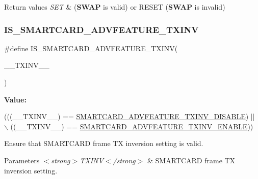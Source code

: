 \begin{DoxyRetVals}{Return values}
{\em S\+ET} & ({\bfseries S\+W\+AP} is valid) or R\+E\+S\+ET ({\bfseries S\+W\+AP} is invalid) \\
\hline
\end{DoxyRetVals}
\mbox{\label{group___s_m_a_r_t_c_a_r_d___private___macros_ga262b4258b744dad01c2452c9f785541a}} 
\subsubsection{\texorpdfstring{I\+S\+\_\+\+S\+M\+A\+R\+T\+C\+A\+R\+D\+\_\+\+A\+D\+V\+F\+E\+A\+T\+U\+R\+E\+\_\+\+T\+X\+I\+NV}{IS\_SMARTCARD\_ADVFEATURE\_TXINV}}
{\footnotesize\ttfamily \#define I\+S\+\_\+\+S\+M\+A\+R\+T\+C\+A\+R\+D\+\_\+\+A\+D\+V\+F\+E\+A\+T\+U\+R\+E\+\_\+\+T\+X\+I\+NV(\begin{DoxyParamCaption}\item[{}]{\+\_\+\+\_\+\+T\+X\+I\+N\+V\+\_\+\+\_\+ }\end{DoxyParamCaption})}

{\bfseries Value\+:}
\begin{DoxyCode}
(((\_\_TXINV\_\_) == \hyperlink{group___s_m_a_r_t_c_a_r_d___tx___inv_gacc817f4b1075b222ffff055a662171ae}{SMARTCARD\_ADVFEATURE\_TXINV\_DISABLE}) || \(\backslash\)
                                                  ((\_\_TXINV\_\_) == 
      \hyperlink{group___s_m_a_r_t_c_a_r_d___tx___inv_ga92a4fb54bdad4c0eb4c216f3de632b06}{SMARTCARD\_ADVFEATURE\_TXINV\_ENABLE}))
\end{DoxyCode}


Ensure that S\+M\+A\+R\+T\+C\+A\+RD frame TX inversion setting is valid. 


\begin{DoxyParams}{Parameters}
{\em $<$strong$>$\+T\+X\+I\+N\+V$<$/strong$>$} & S\+M\+A\+R\+T\+C\+A\+RD frame TX inversion setting. \\
\hline
\end{DoxyParams}

